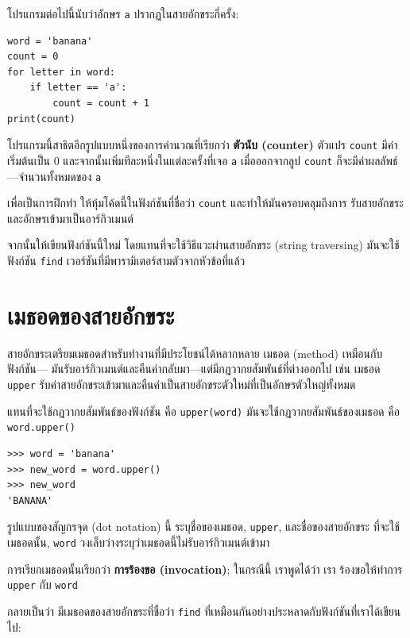 โปรแกรมต่อไปนี้นับว่าอักษร {\tt a} ปรากฏในสายอักขระกี่ครั้ง:

\begin{verbatim}
word = 'banana'
count = 0
for letter in word:
    if letter == 'a':
        count = count + 1
print(count)
\end{verbatim}
%
โปรแกรมนี้สาธิตอีกรูปแบบหนึ่งของการคำนวณที่เรียกว่า {\bf ตัวนับ (counter)}
ตัวแปร {\tt count} มีค่าเริ่มต้นเป็น 0 และจากนั้นเพิ่มทีละหนึ่งในแต่ละครั้งที่เจอ {\tt a}
เมื่อออกจากลูป {\tt count} ก็จะมีค่าผลลัพธ์---จำนวนทั้งหมดของ {\tt a}

เพื่อเป็นการฝึกทำ ให้หุ้มโค้ดนี้ในฟังก์ชันที่ชื่อว่า {\tt count} และทำให้มันครอบคลุมถึงการ
รับสายอักขระและอักษรเข้ามาเป็นอาร์กิวเมนต์

จากนั้นให้เขียนฟังก์ชันนี้ใหม่ โดยแทนที่จะใช้วิธีแวะผ่านสายอักขระ (string traversing) มันจะใช้ฟังก์ชัน 
{\tt find} เวอร์ชันที่มีพารามิเตอร์สามตัวจากหัวข้อที่แล้ว


\section{เมธอดของสายอักขระ}%
\label{optional}

สายอักขระเตรียมเมธอดสำหรับทำงานที่มีประโยชน์ได้หลากหลาย  เมธอด (method) เหมือนกับฟังก์ชัน---
มันรับอาร์กิวเมนต์และคืนค่ากลับมา---แต่มีกฎวากยสัมพันธ์ที่ต่างออกไป เช่น เมธอด {\tt upper}
รับค่าสายอักขระเข้ามาและคืนค่าเป็นสายอักขระตัวใหม่ที่เป็นอักษรตัวใหญ่ทั้งหมด


แทนที่จะใช้กฎวากยสัมพันธ์ของฟังก์ชัน คือ {\tt upper(word)} มันจะใช้กฎวากยสัมพันธ์ของเมธอด คือ 
{\tt word.upper()}

\begin{verbatim}
>>> word = 'banana'
>>> new_word = word.upper()
>>> new_word
'BANANA'
\end{verbatim}
%
รูปแบบของสัญกรจุด (dot notation) นี้ ระบุชื่อของเมธอด, {\tt upper}, และชื่อของสายอักขระ
ที่จะใช้เมธอดนั้น, {\tt word}  วงเล็บว่างระบุว่าเมธอดนี้ไม่รับอาร์กิวเมนต์เข้ามา

การเรียกเมธอดนั้นเรียกว่า {\bf การร้องขอ (invocation)}; ในกรณีนี้ เราพูดได้ว่า เรา
ร้องขอให้ทำการ {\tt upper} กับ {\tt word}

กลายเป็นว่า มีเมธอดของสายอักขระที่ชื่อว่า {\tt find} ที่เหมือนกันอย่างประหลาดกับฟังก์ชันที่เราได้เขียนไป:

